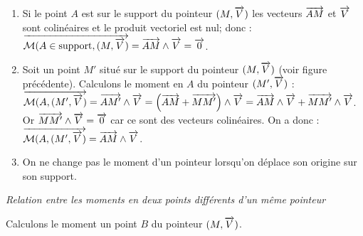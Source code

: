 \documentclass[10pt,oneside]{article}
\begin{document}
\begin{props}
\begin{enumerate}
\item Si le point $A$ est sur le support du pointeur $(M,\overrightarrow{V})$ les vecteurs $\overrightarrow{AM}$ et $\overrightarrow{V}$ sont colinéaires et le produit vectoriel est nul; donc : 
$\overrightarrow{\mathcal{M}(A\in\text{support},(M,\overrightarrow{V})} = \overrightarrow{AM} \wedge \overrightarrow{V} =\overrightarrow{0}$.
\item Soit un point $M'$ situé sur le support du pointeur $(M,\overrightarrow{V})$ (voir figure précédente). Calculons le moment en $A$ du pointeur $(M',\overrightarrow{V})$ :
$\overrightarrow{\mathcal{M}(A,(M',\overrightarrow{V})} = \overrightarrow{AM'} \wedge \overrightarrow{V} = \left(\overrightarrow{AM}+\overrightarrow{MM'} \right)\wedge \overrightarrow{V} = \overrightarrow{AM}\wedge \overrightarrow{V}+\overrightarrow{MM'}\wedge \overrightarrow{V}$. Or $\overrightarrow{MM'}\wedge\overrightarrow{V}=\overrightarrow{0}$ car ce sont des vecteurs colinéaires. On a donc :
$\overrightarrow{\mathcal{M}(A,(M',\overrightarrow{V})} = \overrightarrow{AM}\wedge \overrightarrow{V}$.
\item On ne change pas le moment d'un pointeur lorsqu'on déplace son origine sur son support. 
\end{enumerate}
\end{props}

\begin{rem}
\textit{Relation entre les moments en deux points différents d'un même pointeur}

Calculons le moment un point $B$ du pointeur $(M,\overrightarrow{V})$. 
\end{rem}


%
%
%
%
%
%
%
\end{document}
